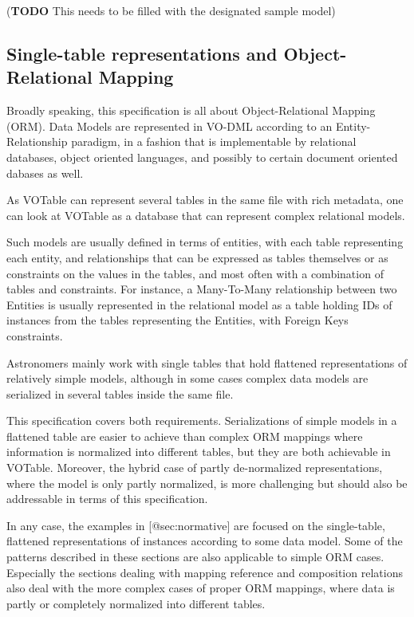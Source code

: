 \documentclass[11pt,a4paper]{ivoa}
\begin{document}
(\textbf{TODO} This needs to be filled with the designated sample model)

\subsection{Single-table representations and Object-Relational
Mapping}\label{single-table-representations-and-object-relational-mapping}

Broadly speaking, this specification is all about Object-Relational
Mapping (ORM). Data Models are represented in VO-DML according to an
Entity-Relationship paradigm, in a fashion that is implementable by
relational databases, object oriented languages, and possibly to certain
document oriented dabases as well.

As VOTable can represent several tables in the same file with rich
metadata, one can look at VOTable as a database that can represent
complex relational models.

Such models are usually defined in terms of entities, with each table
representing each entity, and relationships that can be expressed as
tables themselves or as constraints on the values in the tables, and
most often with a combination of tables and constraints. For instance, a
Many-To-Many relationship between two Entities is usually represented in
the relational model as a table holding IDs of instances from the tables
representing the Entities, with Foreign Keys constraints.

Astronomers mainly work with single tables that hold flattened
representations of relatively simple models, although in some cases
complex data models are serialized in several tables inside the same
file.

This specification covers both requirements. Serializations of simple
models in a flattened table are easier to achieve than complex ORM
mappings where information is normalized into different tables, but they
are both achievable in VOTable. Moreover, the hybrid case of partly
de-normalized representations, where the model is only partly
normalized, is more challenging but should also be addressable in terms
of this specification.

In any case, the examples in {[}@sec:normative{]} are focused on the
single-table, flattened representations of instances according to some
data model. Some of the patterns described in these sections are also
applicable to simple ORM cases. Especially the sections dealing with
mapping reference and composition relations also deal with the more
complex cases of proper ORM mappings, where data is partly or completely
normalized into different tables.
\end{document}
